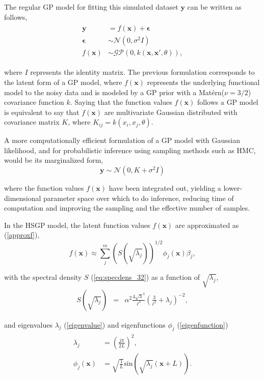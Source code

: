 \documentclass[]{interact}
\theoremstyle{plain}%
\theoremstyle{definition}
\theoremstyle{remark}
\begin{document}
The regular GP model for fitting this simulated dataset $\bm{y}$ can be written as follows,
%
\begin{eqnarray*}\label{eq:latentgp_simudata1}
\begin{split}
\bm{y} &= f(\bm{x}) + \bm{\epsilon} \\
\bm{\epsilon} &\sim \mathcal{N}(0, \sigma^2  I) \\
f(\bm{x}) &\sim \mathcal{GP}(0, k(\bm{x}, \bm{x}', \theta)),
\end{split}
\end{eqnarray*}

\noindent where $I$ represents the identity matrix. The previous formulation corresponds to the latent form of a GP model, where $f(\bm{x})$ represents the underlying functional model to the noisy data and is modeled by a GP prior with a Mat{\'e}rn($\nu=3/2$) covariance function $k$. Saying that the function values $f(\bm{x})$ follows a GP model is equivalent to say that $f(\bm{x})$ are multivariate Gaussian distributed with covariance matrix $K$, where $K_{ij}=k(x_i,x_j,\theta)$.
 
A more computationally efficient formulation of a GP model with Gaussian likelihood, and for probabilistic inference using sampling methods such as HMC, would be its marginalized form,
%
\begin{equation*}\label{eq:marginalizedgp_simudata1}
\bm{y} \sim \mathcal{N}(0, K + \sigma^2 I )
\end{equation*}

\noindent where the function values $f(\bm{x})$ have been integrated out, yielding a lower-dimensional parameter space over which to do inference, reducing time of computation and improving the sampling and the effective number of samples.

In the HSGP model, the latent function values $f(\bm{x})$ are approximated as (\ref{approxf}),
%
\begin{equation*}
f(\bm{x}) \approx \sum_{j}^m \left( S(\sqrt{\lambda_j})\right)^{1/2} \phi_j(\bm{x}) \beta_j,
\end{equation*}

\noindent with the spectral density $S$ (\ref{eq:specdens_32}) as a function of $\sqrt{\lambda_j}$,
%
\begin{eqnarray*}
S(\sqrt{\lambda_j})&=& \alpha^2 \frac{4\sqrt{3}^{3}}{\ell^3}(\frac{3}{\ell^2} + \lambda_j)^{-2}, 
\end{eqnarray*}

\noindent and eigenvalues $\lambda_j$ (\ref{eigenvalue}) and eigenfunctions $\phi_j$ (\ref{eigenfunction})
%
\begin{eqnarray*}
\begin{split}
\lambda_j&=\left(\frac{j\pi}{2L}\right)^2, \\
\phi_j(\bm{x})&=\sqrt{\frac{1}{L}} \text{sin}\left(\sqrt{\lambda_j}(\bm{x}+L)\right).
\end{split}
\end{eqnarray*} 
\end{document}
